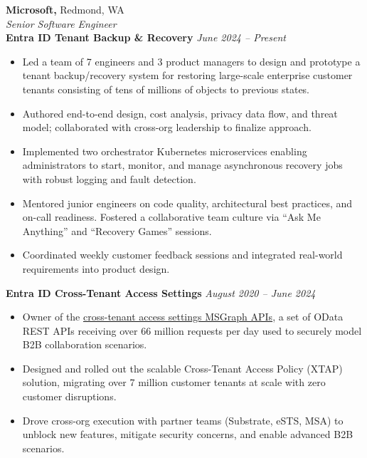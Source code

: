 \documentclass[11pt]{article}
\begin{document}
\noindent
\textbf{Microsoft,} Redmond, WA\\
\emph{Senior Software Engineer}\\
\noindent\textbf{Entra ID Tenant Backup \& Recovery} \hfill\textit{June 2024 -- Present}
\begin{itemize}[noitemsep,nolistsep,label={-}]
	\item Led a team of 7 engineers and 3 product managers to design and prototype a tenant backup/recovery system for restoring large-scale enterprise customer tenants consisting of tens of millions of objects to previous states.
	\item Authored end-to-end design, cost analysis, privacy data flow, and threat model; collaborated with cross-org leadership to finalize approach.
	\item Implemented two orchestrator Kubernetes microservices enabling administrators to start, monitor, and manage asynchronous recovery jobs with robust logging and fault detection.
	\item Mentored junior engineers on code quality, architectural best practices, and on-call readiness. Fostered a collaborative team culture via “Ask Me Anything” and “Recovery Games” sessions.
	\item Coordinated weekly customer feedback sessions and integrated real-world requirements into product design.
\end{itemize}

\noindent\textbf{Entra ID Cross-Tenant Access Settings} \hfill\textit{August 2020 -- June 2024}
\begin{itemize}[noitemsep,nolistsep,label={-}]
	\item Owner of the \href{https://learn.microsoft.com/en-us/entra/external-id/cross-tenant-access-overview}{cross-tenant access settings MSGraph APIs}, a set of OData REST APIs receiving over 66 million requests per day used to securely model B2B collaboration scenarios.
	\item Designed and rolled out the scalable Cross-Tenant Access Policy (XTAP) solution, migrating over 7 million customer tenants at scale with zero customer disruptions.
	\item Drove cross-org execution with partner teams (Substrate, eSTS, MSA) to unblock new features, mitigate security concerns, and enable advanced B2B scenarios.
\end{itemize}

\vspace{0.6cm}
\end{document}
